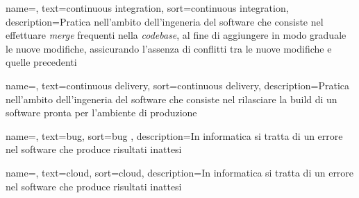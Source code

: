 {
    name=,
    text=continuous integration,
    sort=continuous integration,
    description={Pratica nell'ambito dell'ingeneria del software che consiste nel effettuare \textit{merge} frequenti nella \textit{codebase}, al fine di aggiungere in modo graduale le nuove modifiche, assicurando l'assenza di conflitti tra le nuove modifiche e quelle precedenti}
}

{
    name=,
    text=continuous delivery,
    sort=continuous delivery,
    description={Pratica nell'ambito dell'ingeneria del software che consiste nel rilasciare la build di un software pronta per l'ambiente di produzione}
}

{
    name=,
    text=bug,
    sort=bug ,
    description={In informatica si tratta di un errore nel software che produce risultati inattesi}
}

{
    name=,
    text=cloud,
    sort=cloud,
    description={In informatica si tratta di un errore nel software che produce risultati inattesi}
}


\renewcommand{\acronymname}{Acronimi e abbreviazioni}

    

    
    
    
    
